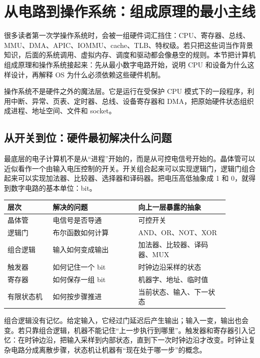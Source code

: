 \section{从电路到操作系统：组成原理的最小主线}

很多读者第一次学操作系统时，会被一组硬件词汇挡住：CPU、寄存器、总线、MMU、DMA、APIC、IOMMU、cache、TLB、特权级。若只把这些词当作背景知识，后面的系统调用、虚拟内存、调度和驱动都会像悬空的规则。本节把计算机组成原理和操作系统接起来：先从最小数字电路开始，说明 CPU 和设备为什么这样设计，再解释 OS 为什么必须依赖这些硬件机制。

\begin{keyidea}
操作系统不是硬件之外的魔法层。它是运行在受保护 CPU 模式下的一段程序，利用中断、异常、页表、定时器、总线、设备寄存器和 DMA，把原始硬件状态组织成进程、地址空间、文件和 socket。
\end{keyidea}

\subsection{从开关到位：硬件最初解决什么问题}

最底层的电子计算机不是从“进程”开始的，而是从可控电信号开始的。晶体管可以近似看作一个由输入电压控制的开关。开关组合起来可以实现逻辑门，逻辑门组合起来可以实现加法器、比较器、选择器和译码器。把电压高低抽象成 1 和 0，就得到数字电路的基本单位：bit。

\begin{longtable}{p{0.18\linewidth}p{0.34\linewidth}p{0.36\linewidth}}
\toprule
层次 & 解决的问题 & 向上一层暴露的抽象 \\
\midrule
晶体管 & 电信号是否导通 & 可控开关 \\
逻辑门 & 布尔函数如何计算 & AND、OR、NOT、XOR \\
组合逻辑 & 输入如何变成输出 & 加法器、比较器、译码器、MUX \\
触发器 & 如何记住一个 bit & 时钟边沿采样的状态 \\
寄存器 & 如何保存一组 bit & 机器字、地址、临时值 \\
有限状态机 & 如何按步骤推进 & 当前状态、输入、下一状态 \\
\bottomrule
\end{longtable}

组合逻辑没有记忆。给定输入，它经过门延迟后产生输出；输入一变，输出也会变。若只靠组合逻辑，机器不能记住“上一步执行到哪里”。触发器和寄存器引入记忆：在时钟边沿，把输入采样到内部状态，直到下一次时钟边沿才改变。时钟让复杂电路分成离散步骤，状态机让机器有“现在处于哪一步”的概念。

